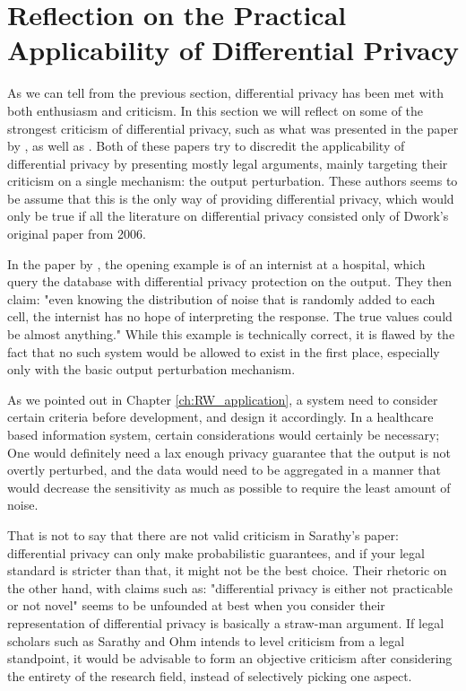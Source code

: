 \section{Reflection on the Practical Applicability of Differential Privacy}

As we can tell from the previous section, differential privacy has been met with both enthusiasm and criticism. In this section we will reflect on some of the strongest criticism of differential privacy, such as what was presented in the paper by \cite{Sarathy2011evaluating}, as well as \cite{ohm2010brokenPrivacyPromise}. Both of these papers try to discredit the applicability of differential privacy by presenting mostly legal arguments, mainly targeting their criticism on a single mechanism: the output perturbation. These authors seems to be assume that this is the only way of providing differential privacy, which would only be true if all the literature on differential privacy consisted only of Dwork's original paper from 2006. 

In the paper by \cite{Sarathy2011evaluating}, the opening example is of an internist at a hospital, which query the database with differential privacy protection on the output. They then claim: "even knowing the distribution of noise that is randomly added to each cell, the internist has no hope of interpreting the response. The true values could be almost anything." While this example is technically correct, it is flawed by the fact that no such system would be allowed to exist in the first place, especially only with the basic output perturbation mechanism. 

As we pointed out in Chapter \ref{ch:RW_application}, a system need to consider certain criteria before development, and design it accordingly. In a healthcare based information system, certain considerations would certainly be necessary; One would definitely need a lax enough privacy guarantee that the output is not overtly perturbed, and the data would need to be aggregated in a manner that would decrease the sensitivity as much as possible to require the least amount of noise.

That is not to say that there are not valid criticism in Sarathy's paper: differential privacy can only make probabilistic guarantees, and if your legal standard is stricter than that, it might not be the best choice. Their rhetoric on the other hand, with claims such as: "differential privacy is either not practicable or not novel" seems to be unfounded at best when you consider their representation of differential privacy is basically a straw-man argument. If legal scholars such as Sarathy and Ohm intends to level criticism from a legal standpoint, it would be advisable to form an objective criticism after considering the entirety of the research field, instead of selectively picking one aspect.

